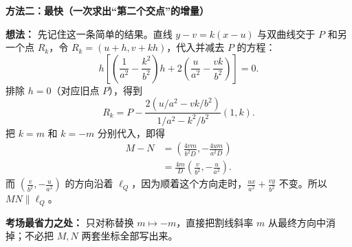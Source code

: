 \clearpage
\begin{proofbox}
\textbf{\textcolor{CProof}{方法二：最快（一次求出“第二个交点”的增量）}}

\begin{center}

\end{center}

\textbf{想法：} 先记住这一条简单的结果。直线 $y-v=k(x-u)$ 与双曲线交于 $P$ 和另一个点 $R_k$，令 $R_k=(u+h,v+kh)$，代入并减去 $P$ 的方程：
\[
 h\left[\left(\frac1{a^2}-\frac{k^2}{b^2}\right)h
       +2\left(\frac{u}{a^2}-\frac{vk}{b^2}\right)\right]=0.
\]
排除 $h=0$（对应旧点 $P$），得到
\[
 \boxed{R_k=P-\frac{2\left(u/a^2-vk/b^2\right)}{1/a^2-k^2/b^2}(1,k)}.
\]
把 $k=m$ 和 $k=-m$ 分别代入，即得
\[
\begin{aligned}
 M-N
 &=\left(\frac{4vm}{b^2D},-\frac{4um}{a^2D}\right)\\
 &=\frac{4m}{D}\left(\frac{v}{b^2},-\frac{u}{a^2}\right).
\end{aligned}
\]
而 $\left(\frac{v}{b^2},-\frac{u}{a^2}\right)$ 的方向沿着 $\ell_Q$，因为顺着这个方向走时，$\frac{ux}{a^2}+\frac{vy}{b^2}$ 不变。所以 $MN\parallel\ell_Q$。

\textbf{考场最省力之处：} 只对称替换 $m\mapsto-m$，直接把割线斜率 $m$ 从最终方向中消掉；不必把 $M,N$ 两套坐标全部写出来。

\end{proofbox}
\clearpage
